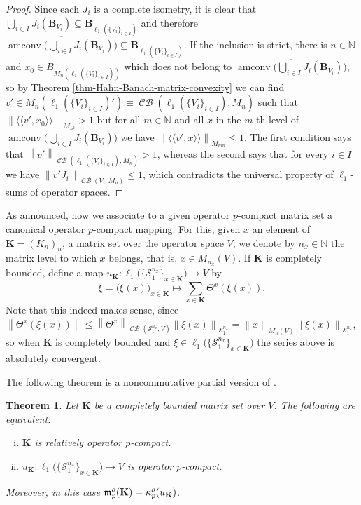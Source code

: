 \documentclass[11pt]{amsart}
\DeclareMathOperator{\CB}{\mathcal{CB}}
\DeclareMathOperator{\amconv}{amconv}
\newcommand{\n}[1]{ \left\|#1\right\| }
\newcommand{\N}{{\mathbb{N}}}
\newcommand{\mpair}[2]{{\langle\langle #1, #2 \rangle\rangle}}
\newtheorem{theorem}{Theorem}[section]
\numberwithin{equation}{section}
\begin{document}
\begin{proof}
Since each $J_i$ is a complete isometry, it is clear that  $\bigcup_{i\in I} J_i(\mathbf{B}_{V_i}) \subseteq \mathbf{B}_{\ell_1( \{ V_i\}_{i \in I} )}$ and therefore
$\overline{\amconv\Big( \bigcup_{i\in I} J_i(\mathbf{B}_{V_i}) \Big)} \subseteq \mathbf{B}_{\ell_1( \{ V_i\}_{i \in I} )}$.
If the inclusion is strict, there is $n\in\N$ and $x_0 \in  B_{M_n( \ell_1( \{ V_i\}_{i \in I} ) )}$ which does not belong to $\overline{\amconv\Big( \bigcup_{i\in I} J_i(\mathbf{B}_{V_i}) \Big)}$, so by Theorem \ref{thm-Hahn-Banach-matrix-convexity} we can find $v' \in M_n(\ell_1( \{ V_i\}_{i \in I} )') \equiv \CB( \ell_1( \{ V_i\}_{i \in I}) ,M_n)$ such that $\n{ \mpair{v'}{x_0} }_{M_{n^2}} > 1$
but for all $m\in\N$ and all $x$ in the $m$-th level of $\amconv\Big( \bigcup_{i\in I} J_i(\mathbf{B}_{V_i}) \Big)$ we have $\n{ \mpair{v'}{x} }_{M_{mn}} \le 1$. 
The first condition says that $\n{v'}_{\CB(\ell_1( \{ V_i\}_{i \in I} ),M_n)}>1$, whereas the second says that for every $i\in I$ we have $\n{v'J_i}_{\CB(V_i,M_n)} \le 1$, which contradicts the universal property of $\ell_1$-sums of operator spaces.
\end{proof}



As announced, now we associate to a given operator $p$-compact matrix set a canonical operator $p$-compact mapping. For this, given $x$ an element of $\mathbf{K} = (K_n)_n$, a matrix set over the operator space $V$, we denote by $n_x \in \N$  the matrix level to which $x$ belongs, that is, $x \in M_{n_x}(V)$.
If $\mathbf{K}$ is completely bounded, define a map  $u_\mathbf{K} : \ell_1\big( \{ \mathcal{S}^{n_x}_1 \}_{x \in \mathbf{K}}\big) \to V$ by
\[
 \xi = \big( \xi(x)  \big)_{x\in \mathbf{K}} \mapsto \sum_{x \in \mathbf{K}} \Theta^x(\xi(x)).
\]
Note that this indeed makes sense, since $\n{\Theta^x(\xi(x))} \le \n{\Theta^x}_{\CB(\mathcal{S}_1^{n_x},V)} \n{\xi(x)}_{\mathcal{S}_1^{n_x}} = \n{x}_{M_n(V)} \n{\xi(x)}_{\mathcal{S}_1^{n_x}}$, so when $\mathbf{K}$ is completely bounded and $\xi \in \ell_1\big( \{ \mathcal{S}^{n_x}_1 \}_{x \in \mathbf{K}}\big)$ the series above is absolutely convergent.


The following theorem is a noncommutative partial version of  \cite[Prop. 3.5]{Delgado-Pineiro-Serrano-adjoints}.

\begin{theorem}\label{thm:equivalences-p-compact-u}
Let $\mathbf{K}$ be a completely bounded matrix set over $V$.
The following are equivalent:
\begin{enumerate}[(i)]
\item $\mathbf{K}$ is relatively operator $p$-compact.
\item $u_\mathbf{K} : \ell_1\big( \{ \mathcal{S}^{n_x}_1 \}_{x \in \mathbf{K}}\big) \to V$ is operator $p$-compact.
\end{enumerate}
Moreover, in this case $\frak m_p^o(\mathbf{K}) = \kappa_p^o(u_\mathbf{K})$.
\end{theorem}
\end{document}
